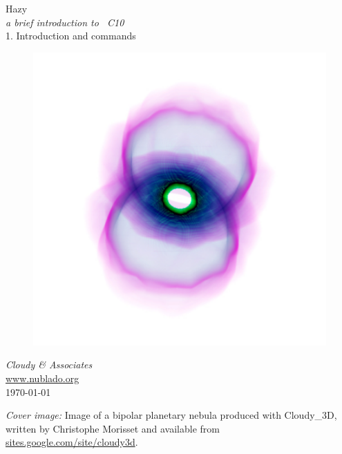 \documentclass[12pt]{book}
\begin{document}
\frontmatter

\begin{titlepage}
\begin{center}

\Huge
Hazy\\
\Large
\emph{a brief introduction to \Cloudy\ C10}\\
\LARGE
1. Introduction and commands

\begin{figure}
\begin{center}
\includegraphics[clip=on,width=\columnwidth,height=0.6\textheight,keepaspectratio]{hazy1_cover}
\end{center}
\end{figure}

\vspace{15 mm }
\LARGE
\emph{Cloudy \& Associates} \\
\Large
\href{http://www.nublado.org}{www.nublado.org} \\
\normalsize
\today
\end{center}
\end{titlepage}

\clearpage

\vspace{5mm}
\noindent
{\small
{\em Cover image:} Image of a bipolar planetary nebula produced with Cloudy\_3D, written by Christophe Morisset
and available from \href{http://sites.google.com/site/cloudy3d/}{sites.google.com/site/cloudy3d}.
}
\clearpage
\end{document}

